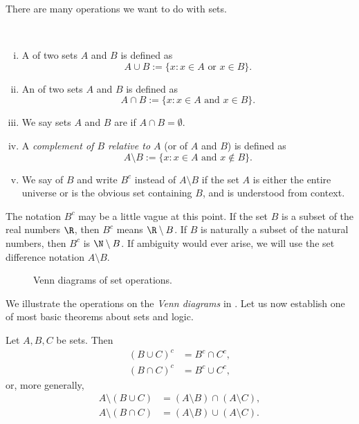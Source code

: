 \documentclass[12pt]{book}
\begin{document}
There are many operations we want to do with sets.

\begin{defn}
{\ }
\begin{enumerate}[(i)]
\item
A \emph{} of two sets $A$ and $B$ is defined as
\begin{equation*}
A \cup B := \{ x : x \in A \text{ or } x \in B \} .
\end{equation*}
\item
An \emph{} of two sets $A$ and $B$ is defined as
\begin{equation*}
A \cap B := \{ x : x \in A \text{ and } x \in B \} .
\end{equation*}
\item
We say sets $A$ and $B$ are \emph{} if $A \cap B =
\emptyset$.
\item
A \emph{complement of $B$ relative to $A$}
(or \emph{} of $A$ and $B$) is defined as
\begin{equation*}
A \setminus B := \{ x : x \in A \text{ and } x \notin B \} .
\end{equation*}
\item
We say
\emph{} of $B$ and write $B^c$ instead of $A \setminus B$ if
the set $A$ is either the entire universe or is the obvious
set containing $B$, and is understood from context.
\end{enumerate}
\end{defn}

The notation $B^c$ may be a little vague at this point.
 If
the set $B$ is a subset of the real numbers $\R$, then $B^c$ means
$\R \setminus B$.
 If $B$ is naturally a subset of the natural numbers,
then $B^c$
is $\N \setminus B$.
 If ambiguity would ever arise, we will 
use the set difference notation $A \setminus B$.

\begin{figure}[h!t]
\begin{center}

\caption{Venn diagrams of set operations.\label{figsetop}}
\end{center}
\end{figure}
We illustrate the operations on the
\emph{Venn diagrams} in .
Let us now establish one of most basic theorems about sets and logic.

\begin{thm}[DeMorgan]
Let $A, B, C$ be sets.
 Then
\begin{align*}
{(B \cup C)}^c &= B^c \cap C^c , \\
{(B \cap C)}^c &= B^c \cup C^c ,
\end{align*}
or, more generally,
\begin{align*}
A \setminus (B \cup C) &= (A \setminus B) \cap (A \setminus C) , \\
A \setminus (B \cap C) &= (A \setminus B) \cup (A \setminus C) .
\end{align*}
\end{thm}
\end{document}
